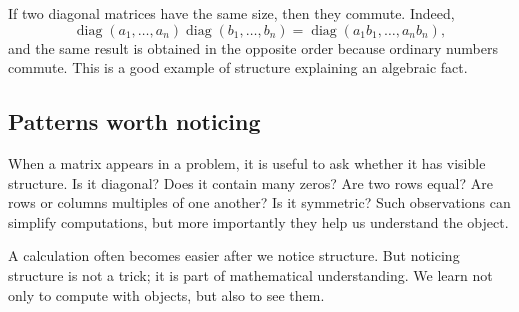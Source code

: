 If two diagonal matrices have the same size, then they commute. Indeed,
\[
\operatorname{diag}(a_1,\ldots,a_n)\operatorname{diag}(b_1,\ldots,b_n)
=
\operatorname{diag}(a_1b_1,\ldots,a_nb_n),
\]
and the same result is obtained in the opposite order because ordinary numbers commute. This is a good example of structure explaining an algebraic fact.

\subsection*{Patterns worth noticing}

When a matrix appears in a problem, it is useful to ask whether it has visible structure. Is it diagonal? Does it contain many zeros? Are two rows equal? Are rows or columns multiples of one another? Is it symmetric? Such observations can simplify computations, but more importantly they help us understand the object.

\begin{remarkbox}
A calculation often becomes easier after we notice structure. But noticing structure is not a trick; it is part of mathematical understanding. We learn not only to compute with objects, but also to see them.
\end{remarkbox}
